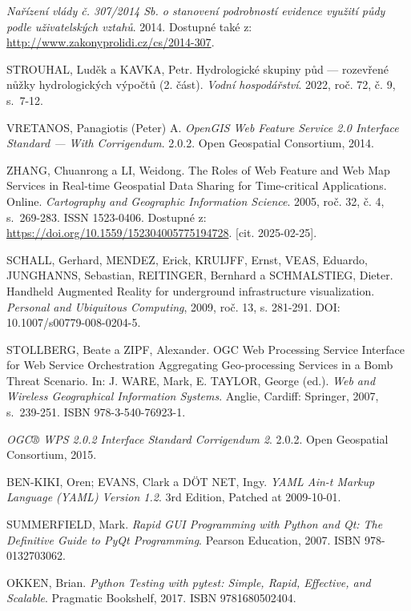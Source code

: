 \documentclass[a4paper,oneside,12pt]{book}
\begin{document}
\begin{thebibliography}{1}
\textit{Nařízení vlády č. 307/2014 Sb. o stanovení podrobností evidence využití půdy podle uživatelských vztahů}. 2014. Dostupné také z: \url{http://www.zakonyprolidi.cz/cs/2014-307}.

STROUHAL, Luděk a KAVKA, Petr. Hydrologické skupiny půd --- rozevřené nůžky hydrologických výpočtů (2. část). \textit{Vodní hospodářství}. 2022, roč. 72, č. 9, s.~7-12.

VRETANOS, Panagiotis (Peter) A. \textit{OpenGIS Web Feature Service 2.0 Interface Standard --- With Corrigendum}. 2.0.2. Open Geospatial Consortium, 2014.

ZHANG, Chuanrong a LI, Weidong. The Roles of Web Feature and Web Map Services in Real-time Geospatial Data Sharing for Time-critical Applications. Online. \textit{Cartography and Geographic Information Science}. 2005, roč. 32, č. 4, s.~269-283. ISSN 1523-0406. Dostupné z: \url{https://doi.org/10.1559/152304005775194728}. [cit. 2025-02-25].

SCHALL, Gerhard, MENDEZ, Erick, KRUIJFF, Ernst, VEAS, Eduardo, JUNGHANNS, Sebastian, REITINGER, Bernhard a SCHMALSTIEG, Dieter.  
Handheld Augmented Reality for underground infrastructure visualization.  
\textit{Personal and Ubiquitous Computing}, 2009, roč. 13, s. 281-291.  
DOI: 10.1007/s00779-008-0204-5.  

STOLLBERG, Beate a ZIPF, Alexander. OGC Web Processing Service Interface for Web Service Orchestration Aggregating Geo-processing Services in a Bomb Threat Scenario. In: J. WARE, Mark, E. TAYLOR, George (ed.). \textit{Web and Wireless Geographical Information Systems}. Anglie, Cardiff: Springer, 2007, s.~239-251. ISBN 978-3-540-76923-1.

\textit{OGC® WPS 2.0.2 Interface Standard Corrigendum 2}. 2.0.2. Open Geospatial Consortium, 2015.

BEN-KIKI, Oren; EVANS, Clark a DÖT NET, Ingy. \textit{YAML Ain-t Markup Language (YAML) Version 1.2}. 3rd Edition, Patched at 2009-10-01.

SUMMERFIELD, Mark. \textit{Rapid GUI Programming with Python and Qt: The Definitive Guide to PyQt Programming}. Pearson Education, 2007. ISBN 978-0132703062.

OKKEN, Brian. \textit{Python Testing with pytest: Simple, Rapid, Effective, and Scalable}. Pragmatic Bookshelf, 2017. ISBN 9781680502404.


\end{thebibliography}
\end{document}
